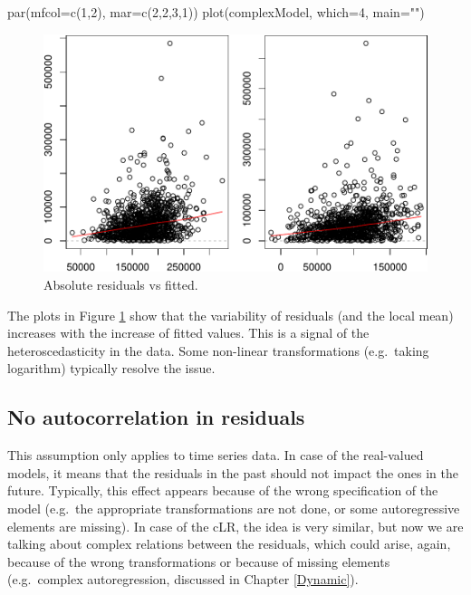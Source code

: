 \documentclass[
]{book}
\newenvironment{Shaded}{\begin{snugshade}}{\end{snugshade}}
\newcommand{\AttributeTok}[1]{\textcolor[rgb]{0.77,0.63,0.00}{#1}}
\newcommand{\DecValTok}[1]{\textcolor[rgb]{0.00,0.00,0.81}{#1}}
\newcommand{\FunctionTok}[1]{\textcolor[rgb]{0.00,0.00,0.00}{#1}}
\newcommand{\NormalTok}[1]{#1}
\newcommand{\StringTok}[1]{\textcolor[rgb]{0.31,0.60,0.02}{#1}}
\begin{document}
\begin{Shaded}
\begin{Highlighting}[]
\FunctionTok{par}\NormalTok{(}\AttributeTok{mfcol=}\FunctionTok{c}\NormalTok{(}\DecValTok{1}\NormalTok{,}\DecValTok{2}\NormalTok{), }\AttributeTok{mar=}\FunctionTok{c}\NormalTok{(}\DecValTok{2}\NormalTok{,}\DecValTok{2}\NormalTok{,}\DecValTok{3}\NormalTok{,}\DecValTok{1}\NormalTok{))}
\FunctionTok{plot}\NormalTok{(complexModel, }\AttributeTok{which=}\DecValTok{4}\NormalTok{, }\AttributeTok{main=}\StringTok{""}\NormalTok{)}
\end{Highlighting}
\end{Shaded}

\begin{figure}
\centering
\includegraphics{Svetunkov---Svetunkov---Complex-Valued-Econometrics_files/figure-latex/heteroDiagnostics-1.pdf}
\caption{\label{fig:heteroDiagnostics}Absolute residuals vs fitted.}
\end{figure}

The plots in Figure \ref{fig:heteroDiagnostics} show that the variability of residuals (and the local mean) increases with the increase of fitted values. This is a signal of the heteroscedasticity in the data. Some non-linear transformations (e.g.~taking logarithm) typically resolve the issue.

\hypertarget{assumptionsResidualsAuto}{%
\subsection{No autocorrelation in residuals}\label{assumptionsResidualsAuto}}

This assumption only applies to time series data. In case of the real-valued models, it means that the residuals in the past should not impact the ones in the future. Typically, this effect appears because of the wrong specification of the model (e.g.~the appropriate transformations are not done, or some autoregressive elements are missing). In case of the cLR, the idea is very similar, but now we are talking about complex relations between the residuals, which could arise, again, because of the wrong transformations or because of missing elements (e.g.~complex autoregression, discussed in Chapter \ref{Dynamic}).
\end{document}
